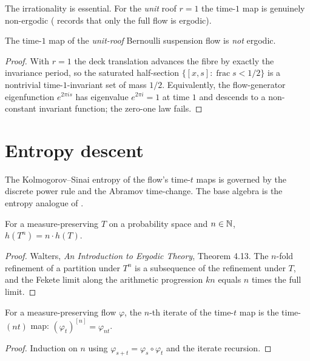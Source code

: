 The irrationality is essential. For the \emph{unit} roof $r = 1$ the time-$1$ map is genuinely
non-ergodic ( records that only the full flow is ergodic).

\begin{theorem}\label{thm:susp-notErgodic}
  \leanok
  The time-$1$ map of the \emph{unit-roof} Bernoulli suspension flow is \emph{not} ergodic.
\end{theorem}
\begin{proof}\leanok
  With $r = 1$ the deck translation advances the fibre by exactly the invariance period, so the
  saturated half-section $\{[x, s] : \operatorname{frac} s < 1/2\}$ is a nontrivial time-$1$-invariant
  set of mass $1/2$. Equivalently, the flow-generator eigenfunction $e^{2\pi i s}$ has eigenvalue
  $e^{2\pi i} = 1$ at time $1$ and descends to a non-constant invariant function; the zero-one law
  fails.
\end{proof}

\section{Entropy descent}

The Kolmogorov--Sinai entropy of the flow's time-$t$ maps is governed by the discrete power rule
and the Abramov time-change. The base algebra is the entropy analogue of .

\begin{theorem}\label{thm:susp-ksPow}
  \leanok
  For a measure-preserving $T$ on a probability space and $n \in \mathbb{N}$, $h(T^n) = n \cdot h(T)$.
\end{theorem}
\begin{proof}\leanok
  Walters, \emph{An Introduction to Ergodic Theory}, Theorem 4.13. The $n$-fold refinement of a
  partition under $T^n$ is a subsequence of the refinement under $T$, and the Fekete limit along
  the arithmetic progression $kn$ equals $n$ times the full limit.
\end{proof}

\begin{theorem}\label{thm:susp-flowIter}
  \leanok
  For a measure-preserving flow $\varphi$, the $n$-th iterate of the time-$t$ map is the
  time-$(nt)$ map: $(\varphi_t)^{[n]} = \varphi_{nt}$.
\end{theorem}
\begin{proof}\leanok
  Induction on $n$ using $\varphi_{s+t} = \varphi_s \circ \varphi_t$ and the iterate recursion.
\end{proof}

